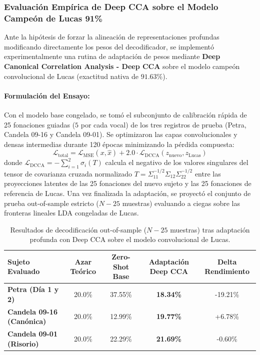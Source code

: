 \documentclass[11pt,a4paper,openany]{book}
\theoremstyle{definition}
\begin{document}
\subsubsection{Evaluación Empírica de Deep CCA sobre el Modelo Campeón de Lucas 91\%}
\label{subsubsec:evaluacion_deep_cca_campeon}

Ante la hipótesis de forzar la alineación de representaciones profundas modificando directamente los pesos del decodificador, se implementó experimentalmente una rutina de adaptación de pesos mediante \textbf{Deep Canonical Correlation Analysis - Deep CCA} sobre el modelo campeón convolucional de Lucas (exactitud nativa de $91.63\%$).

\paragraph{Formulación del Ensayo:}
Con el modelo base congelado, se tomó el subconjunto de calibración rápida de 25 fonaciones guiadas ($5$ por cada vocal) de los tres registros de prueba (Petra, Candela 09-16 y Candela 09-01). Se optimizaron las capas convolucionales y densas intermedias durante 120 épocas minimizando la pérdida compuesta:
\begin{equation}
    \mathcal{L}_{\text{total}} = \mathcal{L}_{\text{MSE}}(x, \hat{x}) + 2.0 \cdot \mathcal{L}_{\text{DCCA}}(z_{\text{nuevo}}, z_{\text{Lucas}})
\end{equation}
donde $\mathcal{L}_{\text{DCCA}} = -\sum_{i=1}^2 \sigma_i(T)$ calcula el negativo de los valores singulares del tensor de covarianza cruzada normalizado $T = \Sigma_{11}^{-1/2} \Sigma_{12} \Sigma_{22}^{-1/2}$ entre las proyecciones latentes de las 25 fonaciones del nuevo sujeto y las 25 fonaciones de referencia de Lucas. Una vez finalizada la adaptación, se proyectó el conjunto de prueba out-of-sample estricto ($N - 25$ muestras) evaluando a ciegas sobre las fronteras lineales LDA congeladas de Lucas.

\begin{table}[H]
\centering
\small
\begin{tabular}{lcccc}
\toprule
\textbf{Sujeto Evaluado} & \textbf{Azar Teórico} & \textbf{Zero-Shot Base} & \textbf{Adaptación Deep CCA} & \textbf{Delta Rendimiento} \\
\midrule
\textbf{Petra (Día 1 y 2)} & 20.0\% & 37.55\% & \textbf{18.34\%} & -19.21\% \\
\textbf{Candela 09-16 (Canónica)} & 20.0\% & 12.99\% & \textbf{19.77\%} & +6.78\% \\
\textbf{Candela 09-01 (Risorio)} & 20.0\% & 22.29\% & \textbf{21.69\%} & -0.60\% \\
\bottomrule
\end{tabular}
\caption{Resultados de decodificación out-of-sample ($N-25$ muestras) tras adaptación profunda con Deep CCA sobre el modelo convolucional de Lucas.}
\label{tab:resultados_deep_cca_calibracion}
\end{table}
\end{document}
